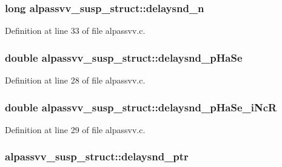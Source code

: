 \subsubsection[{\texorpdfstring{delaysnd\+\_\+n}{delaysnd_n}}]{\setlength{\rightskip}{0pt plus 5cm}long alpassvv\+\_\+susp\+\_\+struct\+::delaysnd\+\_\+n}\hypertarget{structalpassvv__susp__struct_aaa748ad75450969eaf599b58020545cb}{}\label{structalpassvv__susp__struct_aaa748ad75450969eaf599b58020545cb}


Definition at line 33 of file alpassvv.\+c.

\subsubsection[{\texorpdfstring{delaysnd\+\_\+p\+Ha\+Se}{delaysnd_pHaSe}}]{\setlength{\rightskip}{0pt plus 5cm}double alpassvv\+\_\+susp\+\_\+struct\+::delaysnd\+\_\+p\+Ha\+Se}\hypertarget{structalpassvv__susp__struct_aba846cd11718a6f0efe094a17787e455}{}\label{structalpassvv__susp__struct_aba846cd11718a6f0efe094a17787e455}


Definition at line 28 of file alpassvv.\+c.

\subsubsection[{\texorpdfstring{delaysnd\+\_\+p\+Ha\+Se\+\_\+i\+NcR}{delaysnd_pHaSe_iNcR}}]{\setlength{\rightskip}{0pt plus 5cm}double alpassvv\+\_\+susp\+\_\+struct\+::delaysnd\+\_\+p\+Ha\+Se\+\_\+i\+NcR}\hypertarget{structalpassvv__susp__struct_a24931e700292536851e3aa2b1e19f267}{}\label{structalpassvv__susp__struct_a24931e700292536851e3aa2b1e19f267}


Definition at line 29 of file alpassvv.\+c.

\subsubsection[{\texorpdfstring{delaysnd\+\_\+ptr}{delaysnd_ptr}}]{ alpassvv\+\_\+susp\+\_\+struct\+::delaysnd\+\_\+ptr}\hypertarget{structalpassvv__susp__struct_a7a5fe820692cbd90d42955a5d1636380}{}\label{structalpassvv__susp__struct_a7a5fe820692cbd90d42955a5d1636380}


